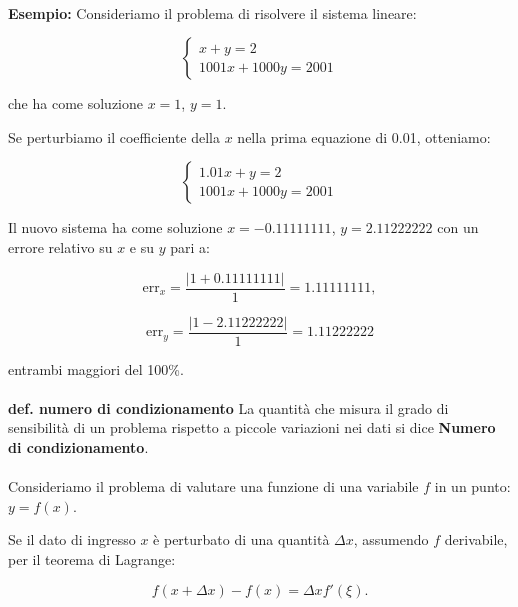 \documentclass[a4paper, 11pt]{article}
\begin{document}
        \paragraph{}
        \textbf{Esempio: }
        Consideriamo il problema di risolvere il sistema lineare:

        \[
            \begin{cases}
            x + y = 2 \\
            1001x + 1000y = 2001
            \end{cases}
        \]

        che ha come soluzione \( x = 1 \), \( y = 1 \).

        Se perturbiamo il coefficiente della \( x \) nella prima equazione di 0.01, otteniamo:

        \[
            \begin{cases}
            1.01x + y = 2 \\
            1001x + 1000y = 2001
            \end{cases}
        \]

        Il nuovo sistema ha come soluzione \( x = -0.11111111 \), \( y = 2.11222222 \) con un errore relativo su \( x \) e su \( y \) pari a:

        \[
            \text{err}_x = \frac{|1 + 0.11111111|}{1} = 1.11111111,
        \]

        \[
            \text{err}_y = \frac{|1 - 2.11222222|}{1} = 1.11222222
        \]

        entrambi maggiori del 100\%.


        \paragraph{}
        \textbf{def. numero di condizionamento }
        La quantità che misura il grado di sensibilità di un problema rispetto a piccole variazioni nei dati si dice \textbf{Numero di condizionamento}.

        \paragraph{}
        Consideriamo il problema di valutare una funzione di una variabile \( f \) in un punto: \( y = f(x) \).

        Se il dato di ingresso \( x \) è perturbato di una quantità \( \Delta x \), assumendo \( f \) derivabile, per il teorema di Lagrange:

        \[
            f(x + \Delta x) - f(x) = \Delta x f'(\xi).
        \]
\end{document}
